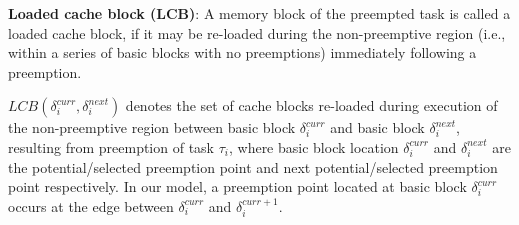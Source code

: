 \begin{definition}
\textbf{Loaded cache block (LCB)}: A memory block of the preempted task is called a loaded cache block, if it may be re-loaded during the non-preemptive region (i.e., within a series of basic blocks with no preemptions) immediately following a preemption.
\end{definition}
\noindent
\begin{math}\textit{LCB}(\delta_{i}^{curr},\delta_{i}^{next})\end{math} denotes the set of cache blocks re-loaded during execution of the non-preemptive region between basic block \begin{math}\delta_{i}^{curr}\end{math} and basic block \begin{math}\delta_{i}^{next}\end{math}, resulting from preemption of task \begin{math}\tau_{i}\end{math}, where basic block location \begin{math}\delta_{i}^{curr}\end{math} and \begin{math}\delta_{i}^{next}\end{math} are the potential/selected preemption point and next potential/selected preemption point respectively.  In our model, a preemption point located at basic block \begin{math}\delta_{i}^{curr}\end{math} occurs at the edge between \begin{math}\delta_{i}^{curr}\end{math} and \begin{math}\delta_{i}^{curr+1}\end{math}.

